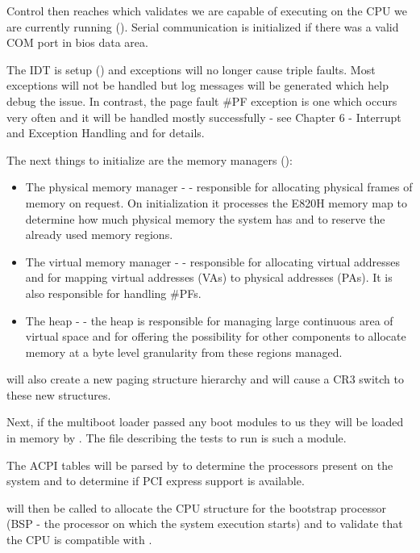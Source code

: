 \begin{appendices}
Control then reaches  which validates we are capable of executing on the CPU we are
currently running (). Serial communication is initialized if there
was a valid COM port in bios data area.

The IDT is setup () and exceptions will no longer cause triple faults. Most
exceptions will not be handled but log messages will be generated which help debug the issue. In
contrast, the page fault \#PF exception is one which occurs very often and it will be handled mostly
successfully - see \cite{intelSys} Chapter 6 - Interrupt and Exception Handling and
 for details.

The next things to initialize are the memory managers ():
\begin{itemize}
	\item The physical memory manager -  - responsible for allocating physical
frames of memory on request. On initialization it processes the E820H memory map to determine how
much physical memory the system has and to reserve the already used memory regions.
	\item The virtual memory manager -  - responsible for allocating virtual addresses
and for mapping virtual addresses (VAs) to physical addresses (PAs). It is also responsible for
handling \#PFs.
	\item The heap -  - the heap is responsible for managing large
continuous area of virtual space and for offering the possibility for other components to allocate
memory at a byte level granularity from these regions managed. 
\end{itemize}

 will also create a new paging structure hierarchy and will cause a CR3 switch
to these new structures.

Next, if the multiboot loader passed any boot modules to us they will be loaded in memory by
. The  file describing the tests to run is such a module.

The ACPI tables will be parsed by  to determine the processors present on
the system and to determine if PCI express support is available.

 will then be called to allocate the CPU structure for the bootstrap
processor (BSP - the processor on which the system execution starts) and to validate that the CPU
is compatible with \projectname.


\end{appendices}
